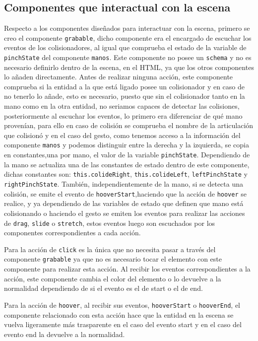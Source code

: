 \documentclass[a4paper, 12pt]{book}
\begin{document}
\subsection{Componentes que interactual con la escena}
\label{subsec:componentes-interactivos}
Respecto a los componentes diseñados para interactuar con la escena, primero se creo el componente \texttt{grabable}, dicho componente era el encargado de escuchar los eventos de los colisionadores, al igual que comprueba el estado de la variable de \texttt{pinchState} del componente \texttt{manos}. Este componente no posee un \texttt{schema} y no es necesario definirlo dentro de la escena, en el HTML, ya que los otros componentes lo añaden directamente. Antes de realizar ninguna acción, este componente comprueba si la entidad a la que está ligado posee un colisionador y en caso de no tenerlo lo añade, esto es necesario, puesto que sin el colisionador tanto en la mano como en la otra entidad, no seriamos capaces de detectar las colisiones, posteriormente al escuchar los eventos, lo primero era diferenciar de qué mano provenían, para ello en caso de colisión se comprueba el nombre de la articulación que colisionó y en el caso del gesto, como tenemos acceso a la información del componente \texttt{manos} y podemos distinguir entre la derecha y la izquierda, se copia en constantes,una por mano, el valor de la variable \texttt{pinchState}. Dependiendo de la mano se actualiza una de las constantes de estado dentro de este componente, dichas constantes son: \texttt{this.colideRight}, \texttt{this.colideLeft}, \texttt{leftPinchState} y \texttt{rightPinchState}. También, independientemente de la mano, si se detecta una colisión,
se emite el evento de \texttt{hooverStart},haciendo que la acción de \texttt{hoover} se realice, y ya dependiendo de las variables de estado que definen que mano está colisionando o haciendo el gesto se emiten los eventos para realizar las acciones de \texttt{drag}, \texttt{slide} o \texttt{stretch}, estos eventos luego son escuchados por los componentes correspondientes a cada acción.

Para la acción de \texttt{click} es la única que no necesita pasar a través del componente \texttt{grabable} ya que no es necesario tocar el elemento con este componente para realizar esta acción. 
Al recibir los eventos correspondientes a la acción, este componente cambia el color del elemento o lo devuelve a la normalidad dependiendo de si el evento es el de start o el de end. 

Para la acción de \texttt{hoover}, al recibir sus eventos, \texttt{hooverStart} o \texttt{hooverEnd}, el componente relacionado con esta acción hace que la entidad en la escena se vuelva ligeramente más trasparente en el caso del evento start y en el caso del evento end la devuelve a la normalidad.
\end{document}
